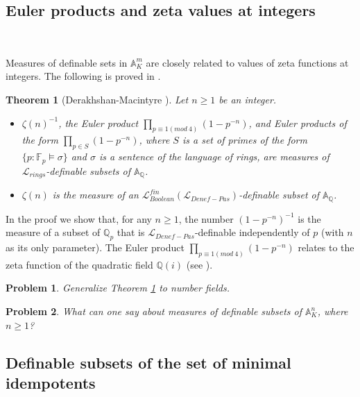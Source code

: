 \documentclass[12pt]{amsart}
\def\A{\mathbb{A}}
\def\F{\mathbb{F}}
\def\cL{\mathcal{L}}
\def\Q{\mathbb{Q}}
\def\F{\mathbb{F}}
\def\cL{\mathcal{L}}
\newtheorem{thm}{Theorem}[section]
\numberwithin{equation}{section}
\newtheorem{prob}{Problem}[section]
\begin{document}
\medskip

\subsection{\bf Euler products and zeta values at integers}\label{ssec-intval} 

\

\medskip

Measures of definable sets in $\A_K^m$ are closely related to values of zeta functions at integers. The following is proved in \cite{DM-ad}.

\begin{thm}[Derakhshan-Macintyre {\cite{DM-ad}}]\label{zeta-measure} Let $n\geq 1$ be an integer.
\noindent
\begin{itemize}
\item $\zeta(n)^{-1}$, the Euler product $\prod_{p\equiv 1(mod~4)}(1-p^{-n})$, and Euler products of the form $\prod_{p\in S} (1-p^{-n})$, where $S$ is a set of primes of the form $\{p: \F_p \models \sigma\}$ 
and $\sigma$ is a sentence of the language of rings, are measures of $\cL_{rings}$-definable subsets of $\A_{\Q}$.
\item $\zeta(n)$ is the measure of an $\mathcal{L}_{Boolean}^{fin}(\cL_{Denef-Pas})$-definable subset of $\A_{\Q}$.
\end{itemize}
\end{thm}

In the proof we show that, for any $n\geq1$, the number $(1-p^{-n})^{-1}$ is the measure of a subset of $\Q_p$ that is $\cL_{Denef-Pas}$-definable independently of $p$ (with $n$ as its only parameter). 
The Euler product $\prod_{p\equiv 1(mod~4)}(1-p^{-n})$ relates to the zeta function of the quadratic field $\Q(i)$ (see \cite{HW}).
\begin{prob}{\cite{DM-ad}} Generalize Theorem \ref{zeta-measure} to number fields.\end{prob}
\begin{prob}{\cite{DM-ad}} What can one say about measures of definable subsets of $\A_K^n$, where $n\geq 1$?\end{prob}

\medskip

\subsection{\bf Definable subsets of the set of minimal idempotents}\label{ssec-defmin} 

\
\end{document}
